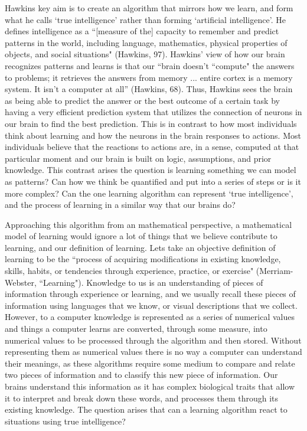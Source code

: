 \documentclass[11pt, oneside]{article}
\begin{document}
\par Hawkins key aim is to create an algorithm that mirrors how we learn, and form what he calls `true intelligence' rather than forming `artificial intelligence'. He defines intelligence as a ``[measure of the] capacity to remember and predict patterns in the world, including language, mathematics, physical properties of objects, and social situations" (Hawkins, 97). Hawkins' view of how our brain recognizes patterns and learns is that our ``brain doesn't ``compute" the answers to problems; it retrieves the answers from memory ... entire cortex is a memory system. It isn't a computer at all'' (Hawkins, 68). Thus, Hawkins sees the brain as being able to predict the answer or the best outcome of a certain task by having a very efficient prediction system that utilizes the connection of neurons in our brain to find the best prediction. This is in contrast to how most individuals think about learning and how the neurons in the brain responses to actions. Most individuals believe that the reactions to actions are, in a sense, computed at that particular moment and our brain is built on logic, assumptions, and prior knowledge. This contrast arises the question is learning something we can model as patterns? Can how we think be quantified and put into a series of steps or is it more complex? Can the one learning algorithm can represent `true intelligence', and the process of learning in a similar way that our brains do?

\par Approaching this algorithm from an mathematical perspective, a mathematical model of learning would ignore a lot of things that we believe contribute to learning, and our definition of learning. Lets take an objective definition of learning to be the ``process of acquiring modifications in existing knowledge, skills, habits, or tendencies through experience, practice, or exercise" (Merriam-Webster, ``Learning"). Knowledge to us is an understanding of pieces of information through experience or learning, and we usually recall these pieces of information using languages that we know, or visual descriptions that we collect. However, to a computer knowledge is represented as a series of numerical values and things a computer learns are converted, through some measure, into numerical values to be processed through the algorithm and then stored. Without representing them as numerical values there is no way a computer can understand their meanings, as these algorithms require some medium to compare and relate two pieces of information and to classify this new piece of information. Our brains understand this information as it has complex biological traits that allow it to interpret and break down these words, and processes them through its existing knowledge. The question arises that can a learning algorithm react to situations using true intelligence? 
\end{document}
